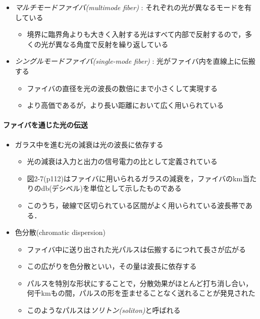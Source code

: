 \documentclass[a4paper]{ltjsarticle}
\begin{document}
\begin{itemize}
				\item \emph{マルチモードファイバ(multimode fiber)} : それぞれの光が異なるモードを有している
				\begin{itemize}
					\item 境界に臨界角よりも大きく入射する光はすべて内部で反射するので，多くの光が異なる角度で反射を繰り返している
				\end{itemize}
				\item \emph{シングルモードファイバ(single-mode fiber)} : 光がファイバ内を直線上に伝搬する
				\begin{itemize}
					\item ファイバの直径を光の波長の数倍にまで小さくして実現する
					\item より高価であるが，より長い距離において広く用いられている
				\end{itemize}
			\end{itemize}
			\paragraph{ファイバを通じた光の伝送}
				\begin{itemize}
					\item ガラス中を進む光の減衰は光の波長に依存する
					\begin{itemize}
						\item 光の減衰は入力と出力の信号電力の比として定義されている
						\item 図2-7(p112)はファイバに用いられるガラスの減衰を，ファイバの\si{km}当たりの\si{db}(デシベル)を単位として示したものである
						\item このうち，破線で区切られている区間がよく用いられている波長帯である．
					\end{itemize}
					\item 色分散(chromatic dispersion)
					\begin{itemize}
						\item ファイバ中に送り出された光パルスは伝搬するにつれて長さが広がる
						\item この広がりを色分散といい，その量は波長に依存する
						\item パルスを特別な形状にすることで，分散効果がほとんど打ち消し合い，何千kmもの間，パルスの形を歪ませることなく送れることが発見された
						\item このようなパルスは\emph{ソリトン(soliton)}と呼ばれる
					\end{itemize}
				\end{itemize}
\end{document}
